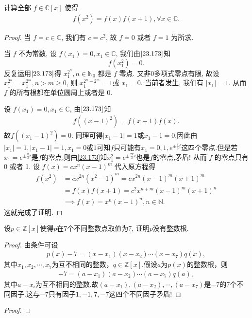 \documentclass[../../main.tex]{subfiles}%
\begin{document}
\begin{example}
计算全部 \( f \in \mathbb{C}[x] \) 使得
\begin{align}
f(x^2) = f(x)f(x+1), \forall x \in \mathbb{C}. \label{23.173}
\end{align}
\end{example}
\begin{proof}

当 \( f = c \in \mathbb{C} \), 我们有 \( c = c^2 \), 故 \( f = 0 \) 或者 \( f = 1 \) 为所求.

当 \( f \) 不为常数, 设 \( f(x_1) = 0, x_1 \in \mathbb{C} \), 我们由\(\eqref{23.173}\)知
\[
f(x_1^2) = 0.
\]
反复运用\(\eqref{23.173}\)得 \( x_1^{2^n}, n \in \mathbb{N}_0 \) 都是 \( f \) 零点. 又非0多项式零点有限, 故设 \( x_1^{2^n} = x_1^{2^m}, n > m \geqslant 0 \), 则 \( x_1^{2^n - 2^m} = 1 \)或 \( x_1 = 0 \). 当前者发生, 我们有 \( |x_1| = 1 \). 从而 \( f \) 的所有根都在单位圆周上或者是 0.

设 \( f(x_1) = 0, x_1 \in \mathbb{C} \), 由\(\eqref{23.173}\)知 
\begin{align*}
f((x-1)^2)=f(x-1)f(x).
\end{align*}
故\( f\left( (x_1 - 1)^2 \right) = 0 \). 同理可得\( |x_1 - 1| = 1 \)或$x_1-1=0$.因此由$|x_1|=1,|x_1-1|=1,x_1=0\text{或}1$可知$f$只可能有$x_1=0,1,e^{\pm \frac{\pi}{3}i} $这四个零点.但是若$x_1=e^{\pm \frac{\pi}{3}i}$是$f$的零点,则由\eqref{23.173}知$x_1^2=e^{\pm \frac{2\pi}{3}i}$也是$f$的零点,矛盾!
从而 \( f \) 的零点只有 0 或者 1. 设 \( f(x) = cx^n(x - 1)^m \) 代入原方程得
\begin{align*}
f(x^2) &= cx^{2n}(x^2 - 1)^m = cx^{2n}(x - 1)^m(x + 1)^m \\
&= f(x)f(x+1) = c^2x^{n+m}(x - 1)^m(x + 1)^n \\
&\implies f(x) = x^n(x - 1)^n, n \in \mathbb{N}.
\end{align*}
这就完成了证明.

\end{proof}

\begin{example}
设$ p \in \mathbb{Z}[x] $使得$ p $在7个不同整数点取值为7, 证明$ p $没有整数根.
\end{example}
\begin{proof}

由条件可设
\begin{align*}
p\left( x \right) -7=\left( x-x_1 \right) \left( x-x_2 \right) \cdots \left( x-x_7 \right) q\left( x \right),
\end{align*}
其中$x_1,x_2,\cdots,x_7$为互不相同的整数，$q\in \mathbb{Z}[x]$.假设$a$为$p\left( x \right)$的整数根，则
\begin{align*}
-7=\left( a-x_1 \right) \left( a-x_2 \right) \cdots \left( a-x_7 \right) q\left( a \right),
\end{align*}
其中$a-x_i$为互不相同的整数.故$\left( a-x_1 \right),\left( a-x_2 \right),\cdots,\left( a-x_7 \right)$是$-7$的$7$个不同因子.这与$-7$只有因子$1,-1,7,-7$这四个不同因子矛盾!

\end{proof}

\begin{example}

\end{example}
\begin{proof}



\end{proof}
\end{document}
